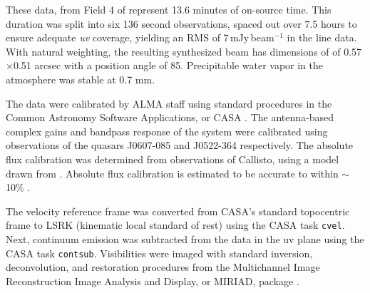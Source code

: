 



These data, from Field 4 of \citet{Mann2014} represent 13.6 minutes of on-source time. This duration was split into six 136 second observations, spaced out over 7.5 hours to ensure adequate \textit{uv} coverage, yielding an RMS of 7\,mJy\,beam$^{-1}$ in the line data. With natural weighting, the resulting synthesized beam has dimensions of of 0.57$\times$0.51 arcsec with a position angle of 85\degree. Precipitable water vapor in the atmosphere was stable at 0.7 mm.


The data were calibrated by ALMA staff using standard procedures in the Common Astronomy Software Applications, or CASA \citep{McMullin2007}. The antenna-based complex gains and bandpass response of the system were calibrated using observations of the quasars J0607-085 and J0522-364 respectively. The absolute flux calibration was determined from observations of Callisto, using a model drawn from \citet{Butler2012}. Absolute flux calibration is estimated to be accurate to within $\sim$10\% \citep{Mann2014}.



The velocity reference frame was converted from CASA's standard topocentric frame to LSRK (kinematic local standard of rest) using the CASA task \texttt{cvel}. Next, continuum emission was subtracted from the data in the uv plane using the CASA task \texttt{contsub}. Visibilities were imaged with standard inversion, deconvolution, and restoration procedures from the Multichannel Image Reconstruction Image Analysis and Display, or MIRIAD, package \citep{Sault1995}.
